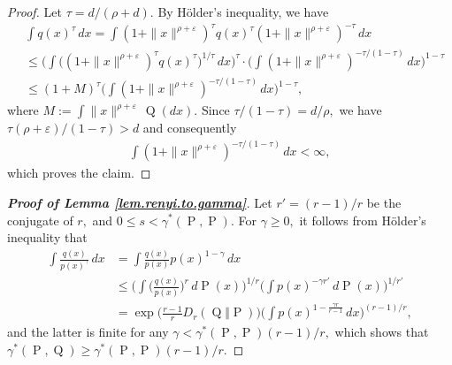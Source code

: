 \documentclass[10pt]{article}
\newcommand{\eps}{\varepsilon}
\renewcommand{\P}{\operatorname{P}}
\newcommand{\Q}{\operatorname{Q}}
\begin{document}
\begin{proof}
Let $\tau = d/(\rho + d).$ By H\"{o}lder's inequality, we have
\begin{align*}
& \int  q(x)^{\tau} \, dx 
   = \int (1 + \|x\|^{\rho + \eps})^{\tau} q(x)^{\tau} (1 + \|x\|^{\rho + \eps})^{-\tau} \, dx\\
&\leq \bigg( \int \bigl( (1 + \|x\|^{\rho + \eps})^{\tau} q(x)^{\tau} \bigr)^{1/\tau} \, dx \bigg)^{\tau} \cdot
           \biggl( \int (1 + \|x\|^{\rho + \eps})^{- \tau / (1 - \tau)} \, dx \biggr)^{1-\tau}
\\
& \leq (1 + M)^{\tau} \biggl( \int (1 + \|x\|^{\rho + \eps})^{- \tau / (1 - \tau)} \, dx \biggr)^{1-\tau},
\end{align*}
where $M := \int\|x\|^{\rho + \eps}\, \Q(dx).$ Since $\tau/(1 - \tau) = d/\rho,$ we have $\tau(\rho + \eps) / (1 - \tau) > d$ and consequently
\begin{align*}
\int (1 + \|x\|^{\rho + \eps})^{- \tau / (1 - \tau)} \, dx < \infty,
\end{align*}
which proves the claim.
\end{proof}

\begin{proof}[\textit{\textbf{Proof of Lemma \ref{lem.renyi.to.gamma}}}]
    Let $r' = (r - 1)/r$ be the conjugate of $r,$ and $0 \leq s < \gamma^*(\P, \P).$ For $\gamma \geq 0,$ it follows from H\"older's inequality that
    \begin{align*}
        \int \frac{q(x)}{p(x)^{\gamma}}\, dx &= \int \frac{q(x)}{p(x)}p(x)^{1 - \gamma}\,dx\\
        &\leq \bigg(\int \Big(\frac{q(x)}{p(x)}\Big)^{r}\,d\P(x)\bigg)^{1/r}\bigg(\int p(x)^{-\gamma r'}\, d\P(x)\bigg)^{1/r'}\\
        &= \exp\Big(\frac{r-1}{r}D_r(\Q \Vert \P)\Big)\bigg(\int p(x)^{1-\frac{\gamma r}{r-1}}\, dx\bigg)^{(r-1)/r},
    \end{align*}
    and the latter is finite for any $\gamma < \gamma^*(\P, \P)(r-1)/r,$ which shows that $\gamma^*(\P, \Q) \geq \gamma^*(\P, \P)(r-1)/r.$
\end{proof}
\end{document}
